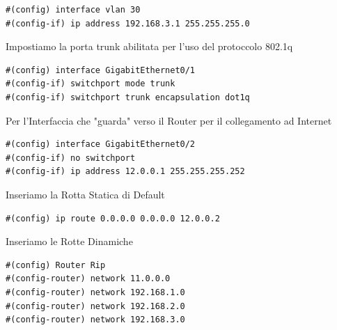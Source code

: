 \documentclass[12pt]{article}
\begin{document}
\begin{center}
\begin{tcolorbox}[title=Multilayer Switch, colframe=gray!50!gray, colback=white!50!white]
\begin{lstlisting}
#(config) interface vlan 30
#(config-if) ip address 192.168.3.1 255.255.255.0
                \end{lstlisting} 
            \end{tcolorbox}
            Impostiamo la porta trunk abilitata per l'uso del protoccolo 802.1q
            \begin{tcolorbox}[title=Multilayer Switch, colframe=gray!50!gray, colback=white!50!white]
                \begin{lstlisting}
#(config) interface GigabitEthernet0/1
#(config-if) switchport mode trunk
#(config-if) switchport trunk encapsulation dot1q
                \end{lstlisting} 
            \end{tcolorbox}
            Per l'Interfaccia che "guarda" verso il Router per il collegamento ad Internet
            \begin{tcolorbox}[title=Multilayer Switch, colframe=gray!50!gray, colback=white!50!white]
                \begin{lstlisting}
#(config) interface GigabitEthernet0/2
#(config-if) no switchport
#(config-if) ip address 12.0.0.1 255.255.255.252
                \end{lstlisting} 
            \end{tcolorbox}
            Inseriamo la Rotta Statica di Default
            \begin{tcolorbox}[title=Multilayer Switch, colframe=gray!50!gray, colback=white!50!white]
                \begin{lstlisting}
#(config) ip route 0.0.0.0 0.0.0.0 12.0.0.2
                \end{lstlisting} 
            \end{tcolorbox}
            Inseriamo le Rotte Dinamiche 
            \begin{tcolorbox}[title=Multilayer Switch, colframe=gray!50!gray, colback=white!50!white]
                \begin{lstlisting}
#(config) Router Rip
#(config-router) network 11.0.0.0
#(config-router) network 192.168.1.0
#(config-router) network 192.168.2.0
#(config-router) network 192.168.3.0
                \end{lstlisting} 
            \end{tcolorbox}
        \end{center}
\end{document}
